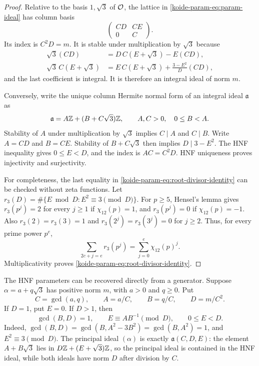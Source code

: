 \begin{proof}
Relative to the basis $1,\sqrt3$ of $\mathcal O$, the lattice in
\eqref{koide-param-eq:param-ideal} has column basis
\[
 \begin{pmatrix}CD&CE\\0&C\end{pmatrix}.
\]
Its index is $C^2D=m$.  It is stable under multiplication by $\sqrt3$
because
\begin{align*}
 \sqrt3(CD)&=D\,C(E+\sqrt3)-E(CD),\\
 \sqrt3\,C(E+\sqrt3)
 &=E\,C(E+\sqrt3)+\frac{3-E^2}{D}(CD),
\end{align*}
and the last coefficient is integral.  It is therefore an integral ideal
of norm $m$.

Conversely, write the unique column Hermite normal form of an integral
ideal $\mathfrak a$ as
\[
 \mathfrak a=A\mathbb Z+(B+C\sqrt3)\mathbb Z,
 \qquad A,C>0,\quad0\leq B<A.
\]
Stability of $A$ under multiplication by $\sqrt3$ implies $C\mid A$ and
$C\mid B$.  Write $A=CD$ and $B=CE$.  Stability of $B+C\sqrt3$ then
implies $D\mid3-E^2$.  The HNF inequality gives $0\leq E<D$, and the
index is $AC=C^2D$.  HNF uniqueness proves injectivity and surjectivity.

For completeness, the last equality in \eqref{koide-param-eq:root-divisor-identity}
can be checked without zeta functions.  Let
$r_3(D)=\#\{E\bmod D:E^2\equiv3\pmod D\}$.  For $p\geq5$, Hensel's
lemma gives $r_3(p^j)=2$ for every $j\geq1$ if
$\chi_{12}(p)=1$, and $r_3(p^j)=0$ if $\chi_{12}(p)=-1$.  Also
$r_3(2)=r_3(3)=1$ and $r_3(2^j)=r_3(3^j)=0$ for $j\geq2$.
Thus, for every prime power $p^e$,
\[
 \sum_{2c+j=e}r_3(p^j)=\sum_{j=0}^e\chi_{12}(p)^j.
\]
Multiplicativity proves \eqref{koide-param-eq:root-divisor-identity}.
\end{proof}

The HNF parameters can be recovered directly from a generator.  Suppose
$\alpha=a+q\sqrt3$ has positive norm $m$, with $a>0$ and $q\geq0$.  Put
\begin{equation}
 C=\gcd(a,q),\qquad A=a/C,\qquad B=q/C,\qquad D=m/C^2.
 \label{koide-param-eq:forward-HNF-pre}
\end{equation}
If $D=1$, put $E=0$.  If $D>1$, then
\begin{equation}
 \gcd(B,D)=1,\qquad E\equiv A B^{-1}\pmod D,\qquad0\leq E<D.
 \label{koide-param-eq:forward-HNF}
\end{equation}
Indeed,
$\gcd(B,D)=\gcd(B,A^2-3B^2)=\gcd(B,A^2)=1$, and
$E^2\equiv3\pmod D$.  The principal ideal $(\alpha)$ is exactly
$\mathfrak a(C,D,E)$: the element $A+B\sqrt3$ lies in
$D\mathbb Z+(E+\sqrt3)\mathbb Z$, so the principal ideal is contained in the HNF
ideal, while both ideals have norm $D$ after division by $C$.

